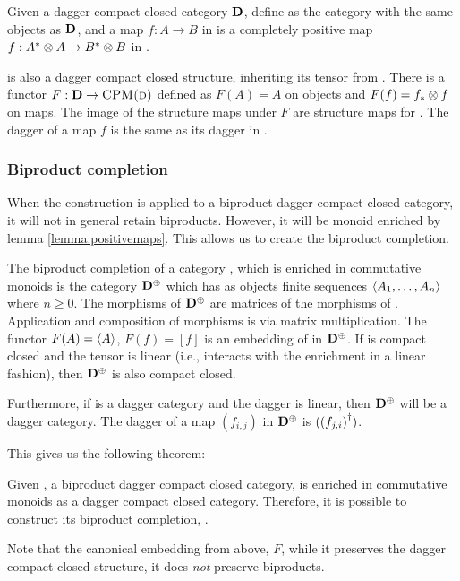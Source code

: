 \begin{definition}\label{def:cpmconstruction}
  Given a dagger compact closed category $\mathbf{D}$, define  as the category with the
  same objects as $\mathbf{D}$, and a map $f:A\to B$ in  is a completely positive map
  $f:A^{*}\otimes A \to B^{*}\otimes B$ in \cD.
\end{definition}

 is also a dagger compact closed structure, inheriting its tensor from \cD.
There is a functor $F:\mathbf{D} \to \textsc{CPM(d)}$ defined as $F(A) = A$ on objects and $F(f)=
f_{*}\otimes f$ on maps. The image of the structure maps under $F$ are structure maps for
. The dagger of a map $f$ is the same as its dagger in \cD.

\subsubsection{Biproduct completion}\label{sec:biproduct}
When the  construction is applied to a biproduct dagger compact closed category, it
will not in general retain biproducts. However, it will be monoid enriched by lemma
\ref{lemma:positivemaps}. This allows us to create the biproduct completion.

The biproduct completion of a category \cD, which is enriched in commutative monoids is the
category $\mathbf{D}^{\oplus}$ which has as objects finite sequences $\langle A_{1},\ldots,A_{n}\rangle$ where $n\ge 0$.
The morphisms of $\mathbf{D}^{\oplus}$ are matrices of the morphisms of \cD. Application and composition of
morphisms is via matrix multiplication. The functor $F(A) = \langle A\rangle$, $F(f)=[f]$ is an embedding of
\cD{} in $\mathbf{D}^{\oplus}$. If \cD{} is compact closed and the tensor is linear (i.e., interacts with the
enrichment in a linear fashion), then $\mathbf{D}^{\oplus}$ is also compact closed.

Furthermore, if \cD{} is a dagger category and the dagger is linear, then $\mathbf{D}^{\oplus}$ will be a
dagger category. The dagger of a map $(f_{i,j})$ in $\mathbf{D}^{\oplus}$ is $({(f_{j,i})}^{\dagger})$.

This gives us the following theorem:

\begin{theorem}\label{theorem:biproductcompletion}
Given \cD, a biproduct dagger compact closed category,  is enriched in commutative monoids
as a dagger compact closed category. Therefore, it is possible to construct its biproduct
completion, .
\end{theorem}

Note that the canonical embedding from above, $F$, while it preserves the dagger compact closed
structure, it does \emph{not} preserve biproducts.
